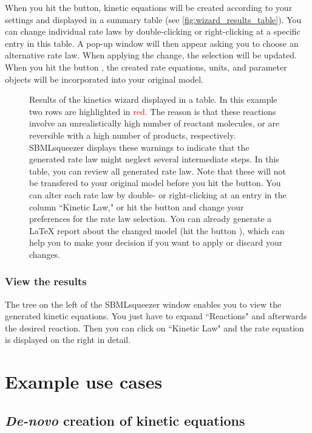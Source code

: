 When you hit the  button, kinetic equations will be created according to your settings and displayed in a summary table (see \vref{fig:wizard_results_table}).
You can change individual rate laws by double-clicking or right-clicking at a specific entry in this table.
A pop-up window will then appear asking you to choose an alternative rate law.
When applying the change, the selection will be updated.
When you hit the button , the created rate equations, units, and parameter objects will be incorporated into your original model.
\begin{figure}
\caption[Results of the kinetics wizard displayed in a table]{Results of the kinetics wizard displayed in a table.
In this example two rows are highlighted in \textcolor{red}{red}.
The reason is that these reactions involve an unrealistically high number of reactant molecules, or are reversible with a high number of products, respectively.
SBMLsqueezer displays these warnings to indicate that the generated rate law might neglect several intermediate steps.
In this table, you can review all generated rate law.
Note that these will not be transfered to your original model before you hit the  button.
You can alter each rate law by double- or right-clicking at an entry in the column ``Kinetic Law," or hit the  button and change your preferences for the rate law selection.
You can already generate a \LaTeX{} report about the changed model (hit the button ), which can help you to make your decision if you want to apply or discard your changes.}
\label{fig:wizard_results_table}
\end{figure}

\subsection{View the results}

The tree on the left of the SBMLsqueezer window enables you to view the generated kinetic equations.
You just have to expand ``Reactions" and afterwards the desired reaction.
Then you can click on ``Kinetic Law" and the rate equation is displayed on the right in detail.


\chapter{Example use cases}

\section{\emph{De-novo} creation of kinetic equations}
